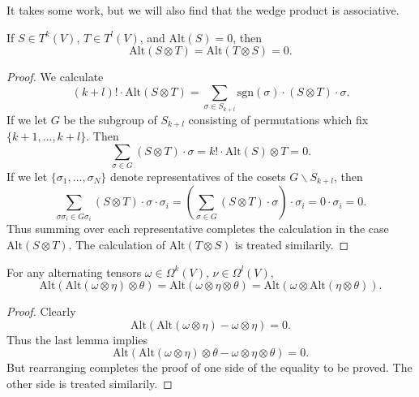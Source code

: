 It takes some work, but we will also find that the wedge product is associative.

\begin{lemma}
    If $S \in T^k(V)$, $T \in T^l(V)$, and $\text{Alt}(S) = 0$, then
    \[ \text{Alt}(S \otimes T) = \text{Alt}(T \otimes S) = 0. \]
\end{lemma}
\begin{proof}
    We calculate
    \[ (k+l)! \cdot \text{Alt}(S \otimes T) = \sum_{\sigma \in S_{k+l}} \text{sgn}(\sigma) \cdot (S \otimes T) \cdot \sigma. \]
    If we let $G$ be the subgroup of $S_{k+l}$ consisting of permutations which fix $\{ k+1, \dots, k+l \}$. Then
    \[ \sum_{\sigma \in G} (S \otimes T) \cdot \sigma = k! \cdot \text{Alt}(S) \otimes T = 0. \]
    If we let $\{ \sigma_1, \dots, \sigma_N \}$ denote representatives of the cosets $G \backslash S_{k+l}$, then
    \[ \sum_{\sigma \sigma_i \in G \sigma_i} (S \otimes T) \cdot \sigma \cdot \sigma_i = \left( \sum_{\sigma \in G} (S \otimes T) \cdot \sigma \right) \cdot \sigma_i = 0 \cdot \sigma_i = 0. \]
    Thus summing over each representative completes the calculation in the case $\text{Alt}(S \otimes T)$. The calculation of $\text{Alt}(T \otimes S)$ is treated similarily.
\end{proof}

\begin{lemma}
    For any alternating tensors $\omega \in \Omega^k(V)$, $\nu \in \Omega^l(V)$,
    \[ \text{Alt}(\text{Alt}(\omega \otimes \eta) \otimes \theta) = \text{Alt}(\omega \otimes \eta \otimes \theta) = \text{Alt}(\omega \otimes \text{Alt}(\eta \otimes \theta)). \]
\end{lemma}
\begin{proof}
    Clearly
    \[ \text{Alt}(\text{Alt}(\omega \otimes \eta) - \omega \otimes \eta) = 0. \]
    Thus the last lemma implies
    \[ \text{Alt}(\text{Alt}(\omega \otimes \eta) \otimes \theta - \omega \otimes \eta \otimes \theta) = 0. \]
    But rearranging completes the proof of one side of the equality to be proved. The other side is treated similarily.
\end{proof}

